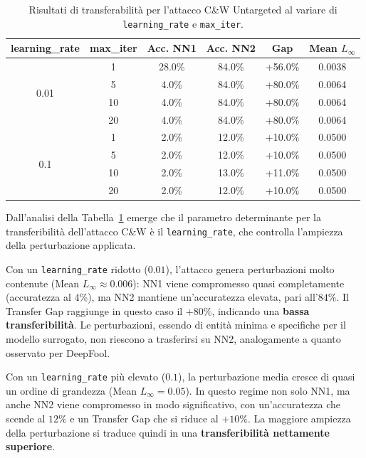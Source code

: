 \documentclass[a4paper, 12pt]{article}
\begin{document}
\begin{table}[htbp]
    \centering
    \vspace{0.2cm}
    \small
    \setlength{\tabcolsep}{8pt}
    \renewcommand{\arraystretch}{1.2}
    \begin{tabular}{cc ccc c}
        \toprule
        \textbf{learning\_rate} & \textbf{max\_iter} 
        & \textbf{Acc. NN1} & \textbf{Acc. NN2} & \textbf{Gap} 
        & \textbf{Mean $L_\infty$} \\
        \midrule
        \multirow{4}{*}{0.01}
            & 1   & 28.0\% & 84.0\% & +56.0\% & 0.0038 \\
            & 5   &  4.0\% & 84.0\% & +80.0\% & 0.0064 \\
            & 10  &  4.0\% & 84.0\% & +80.0\% & 0.0064 \\
            & 20  &  4.0\% & 84.0\% & +80.0\% & 0.0064 \\
        \midrule
        \multirow{4}{*}{0.1}
            & 1   &  2.0\% & 12.0\% & +10.0\% & 0.0500 \\
            & 5   &  2.0\% & 12.0\% & +10.0\% & 0.0500 \\
            & 10  &  2.0\% & 13.0\% & +11.0\% & 0.0500 \\
            & 20  &  2.0\% & 12.0\% & +10.0\% & 0.0500 \\
        \bottomrule
    \end{tabular}
    \caption{Risultati di transferabilità per l'attacco C\&W Untargeted al variare 
    di \texttt{learning\_rate} e \texttt{max\_iter}.}
    \label{tab:cw_transferability}
\end{table}

Dall'analisi della Tabella~\ref{tab:cw_transferability} emerge che il parametro 
determinante per la transferibilità dell'attacco C\&W è il \texttt{learning\_rate}, 
che controlla l'ampiezza della perturbazione applicata.

Con un \texttt{learning\_rate} ridotto ($0.01$), l'attacco genera perturbazioni 
molto contenute (Mean $L_\infty \approx 0.006$): NN1 viene compromesso quasi 
completamente (accuratezza al $4\%$), ma NN2 mantiene un'accuratezza elevata, 
pari all'$84\%$. Il Transfer Gap raggiunge in questo caso il $+80\%$, indicando 
una \textbf{bassa transferibilità}. Le perturbazioni, essendo di entità minima e 
specifiche per il modello surrogato, non riescono a trasferirsi su NN2, 
analogamente a quanto osservato per DeepFool.

Con un \texttt{learning\_rate} più elevato ($0.1$), la perturbazione media cresce 
di quasi un ordine di grandezza (Mean $L_\infty = 0.05$). In questo regime non 
solo NN1, ma anche NN2 viene compromesso in modo significativo, con un'accuratezza 
che scende al $12\%$ e un Transfer Gap che si riduce al $+10\%$. La maggiore 
ampiezza della perturbazione si traduce quindi in una \textbf{transferibilità 
nettamente superiore}.
\end{document}
